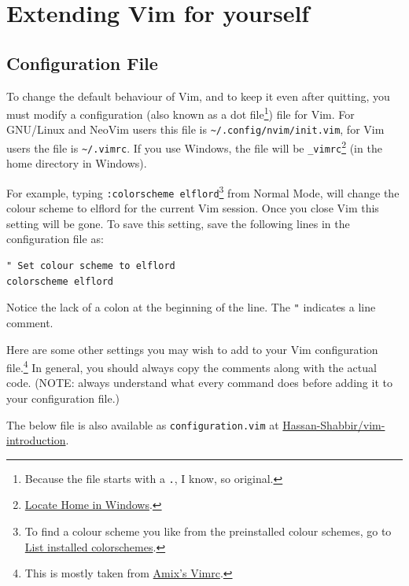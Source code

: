 \documentclass[11pt]{article}
\begin{document}
\section{Extending Vim for yourself}
\label{sec:org28d5361}
\subsection{Configuration File}
\label{sec:org8e6499a}
To change the default behaviour of Vim, and to keep it even after quitting, you
must modify a configuration (also known as a dot file\footnote{Because the file starts with a \texttt{.}, I know, so original.}) file for Vim. For
GNU/Linux and NeoVim users this file is \texttt{\textasciitilde{}/.config/nvim/init.vim}, for Vim users
the file is \texttt{\textasciitilde{}/.vimrc}. If you use Windows, the file will be \texttt{\_vimrc}\footnote{\href{https://superuser.com/questions/86246/where-should-the-vimrc-file-be-located-on-windows-7}{Locate Home in Windows}.} (in
the home directory in Windows).

For example, typing \texttt{:colorscheme elflord}\footnote{To find a colour scheme you like from the preinstalled colour 
schemes, go to \href{https://stackoverflow.com/questions/7331940/how-to-get-the-list-of-all-installed-color-schemes-in-vim}{List installed colorschemes}.} from Normal Mode, will change
the colour scheme to elflord for the current Vim session. Once you close Vim
this setting will be gone. To save this setting, save the following lines in the
configuration file as:

\begin{verbatim}
" Set colour scheme to elflord 
colorscheme elflord 
\end{verbatim}

Notice the lack of a colon at the beginning of the line. The \texttt{"} indicates a
line comment.

Here are some other settings you may wish to add to your Vim configuration
file.\footnote{This is mostly taken from \href{https://github.com/amix/vimrc}{Amix's Vimrc}.} In general, you should always copy the comments along with the
actual code. (NOTE: always understand what every command does before adding it
to your configuration file.)

The below file is also available as \texttt{configuration.vim} at
\href{https://github.com/Hassan-Shabbir/vim-introduction}{Hassan-Shabbir/vim-introduction}.
\end{document}
